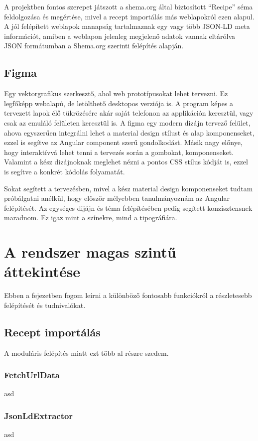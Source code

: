 \documentclass[12pt]{report}
\theoremstyle{definition}
\begin{document}
A projektben fontos szerepet játszott a shema.org által biztosított “Recipe” séma feldolgozása és megértése, mivel a recept importálás más weblapokról ezen alapul. A jól felépített weblapok manapság tartalmaznak egy vagy több JSON-LD meta információt, amiben a weblapon jelenleg megjelenő adatok vannak eltárólva JSON formátumban a Shema.org szerinti felépítés alapján.

\section{Figma}
Egy  vektorgrafikus szerkesztő, ahol web prototípusokat lehet tervezni. Ez legfőképp webalapú, de letölthető desktopos verziója is. A program képes a tervezett lapok élő tükrözésére akár saját telefonon az applikáción keresztül, vagy csak az emuláló felületen keresztül is. A figma egy modern dizájn tervező felület, ahova egyszerűen integrálni lehet a material design stílust és alap komponenseket, ezzel is segítve az Angular component szerű gondolkodást. Másik nagy előnye, hogy interaktívvá lehet tenni a tervezés során a gombokat, komponenseket. Valamint a kész dizájnoknak meglehet nézni a pontos CSS stílus kódját is, ezzel is segítve a konkrét kódolás folyamatát.

Sokat segített a tervezésben, mivel a kész material design komponenseket tudtam próbálgatni anélkül, hogy először mélyebben tanulmányoznám az Angular felépítését. Az egységes dijájn és téma felépítésében pedig segített konzisztensnek maradnom. Ez igaz mint a színekre, mind a tipográfiára.


\chapter{A rendszer magas szintű áttekintése}
Ebben a fejezetben fogom leírni a különböző fontosabb funkciókról a részletesebb felépítését és tudnivalókat.

\section{Recept importálás}
A moduláris felépítés miatt ezt több al részre szedem.

\subsection{FetchUrlData}
asd
\subsection{JsonLdExtractor}
asd
\end{document}
